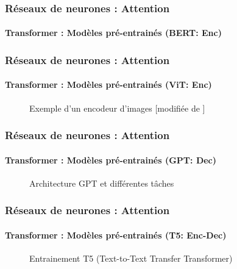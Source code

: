 \documentclass[xcolor=table]{beamer}
\begin{document}
\begin{frame}
	\frametitle{Réseaux de neurones : Attention}
	\framesubtitle{Transformer : Modèles pré-entrainés (BERT: Enc) \cite{devlin-etal-2019-bert}}

	\begin{center}
	\end{center}
	
\end{frame}

\begin{frame}
	\frametitle{Réseaux de neurones : Attention}
	\framesubtitle{Transformer : Modèles pré-entrainés (ViT: Enc) \cite{dosovitskiy2021an}}
	
	
	\vspace{-6pt}
	\begin{figure}[htp!]
		\centering
		\vskip-8pt
		\caption{Exemple d'un encodeur d'images [modifiée de \cite{zhang2021dive}]}
	\end{figure}
	
\end{frame}


\begin{frame}
	\frametitle{Réseaux de neurones : Attention}
	\framesubtitle{Transformer : Modèles pré-entrainés (GPT: Dec) \cite{radford2018improving}}
	
	\begin{figure}[htbp]
		\caption{Architecture GPT et différentes tâches \cite{radford2018improving}}
	\end{figure}
	
\end{frame}


\begin{frame}
	\frametitle{Réseaux de neurones : Attention}
	\framesubtitle{Transformer : Modèles pré-entrainés (T5: Enc-Dec) \cite{T5}}
	
	\begin{figure}[htbp]
		\caption{Entrainement T5 (Text-to-Text Transfer Transformer) \cite{T5}}
	\end{figure}
	
\end{frame}
\end{document}

